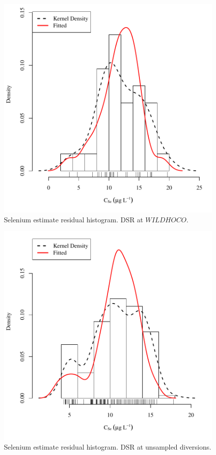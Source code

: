 \begin{figure}[htbp]
	\begin{center}
	\includegraphics[width=6in]{"Figures/Results_DSR/Conc Model ResDist WIL"}
	\caption{Selenium estimate residual histogram.  DSR at $WILDHOCO$.}
	\end{center}
\end{figure}
\newpage

\begin{figure}[htbp]
	\begin{center}
	\includegraphics[width=6in]{"Figures/Results_DSR/Conc Model ResDist DDIV"}
	\caption{Selenium estimate residual histogram.  DSR at unsampled diversions.}
	\end{center}
\end{figure}
\newpage